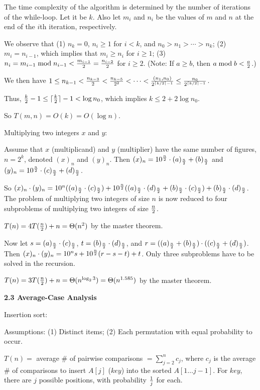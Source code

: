 \documentclass[8pt]{minimal}
\begin{document}
\begin{flushleft}
\begin{multicols}{3}
The time complexity of the algorithm is determined by the number of iterations
of the while-loop. Let it be $k$. Also let $m_i$ and $n_i$ be the values of
$m$ and $n$ at the end of the $i$th iteration, respectively.

We observe that (1) $n_k=0$, $n_i\ge 1$ for $i<k$, and 
$n_0>n_1>\cdots>n_k$; (2) $m_i=n_{i-1}$, which implies that $m_i\ge n_i$ 
for $i\ge1$; (3) $n_i=m_{i-1} \bmod n_{i-1}<{m_{i-1}\over2}={n_{i-2}\over2}$
for $i\ge2$. (Note: If $a\ge b$, then $a\bmod b<{a\over2}$.)

We then have $1\le n_{k-1}<{n_{k-3}\over2}<{n_{k-5}\over2^2}<\cdots<
{(n_1,n_0)\over2^{\lceil k/2\rceil-1}}\le {n_0\over2^{\lceil k/2\rceil-1}}$.

Thus, ${k\over2}-1\le\lceil{k\over2}\rceil-1<\log n_0$,
which implies $k\le 2+2\log n_0$.

So $T(m,n)=O(k)=O(\log n)$.



Multiplying two integers $x$ and $y$: 

Assume that $x$ (multiplicand) and $y$ (multiplier) 
have the same number of figures, $n=2^k$,
denoted $(x)_n$ and $(y)_n$.
Then $(x)_n=10^{n\over2}\cdot(a)_{n\over2}+(b)_{n\over2}$ and
$(y)_n=10^{n\over2}\cdot(c)_{n\over2}+(d)_{n\over2}$.

So $(x)_n\cdot(y)_n=10^n((a)_{n\over2}\cdot (c)_{n\over2})+
10^{n\over2}((a)_{n\over2}\cdot (d)_{n\over2}+ (b)_{n\over2}\cdot
(c)_{n\over2})+(b)_{n\over2}\cdot (d)_{n\over2}$. The problem of 
multiplying two integers of size $n$ is now reduced to four subproblems
of multiplying two integers of size $n\over2$.

$T(n)=4T({n\over2})+n=\Theta(n^2)$ by the master theorem.

Now let $s=(a)_{n\over2}\cdot (c)_{n\over2}$,
$t=(b)_{n\over2}\cdot (d)_{n\over2}$, and
$r=((a)_{n\over2}+(b)_{n\over2})\cdot((c)_{n\over2}+(d)_{n\over2})$.
Then $(x)_n\cdot(y)_n=10^ns+10^{n\over2}(r-s-t)+t$. Only three
subproblems have to be solved in the recursion.

$T(n)=3T({n\over2})+n=\Theta(n^{\log_23})=\Theta(n^{1.585})$ 
by the master theorem.


    \textbf{2.3 Average-Case Analysis}

Insertion sort:

Assumptions: (1) Distinct items; (2) Each permutation with equal
probability to occur.

$T(n)=$ average \# of pairwise comparisons $=\sum_{j=2}^n c_j$, where
$c_j$ is the average \# of comparisons to insert $A[j]$ ($key$) into the sorted
$A[1\ldots j-1]$. For $key$, there are $j$ possible positions, with 
probability ${1\over j}$ for each.


\end{multicols}
\end{flushleft}
\end{document}
